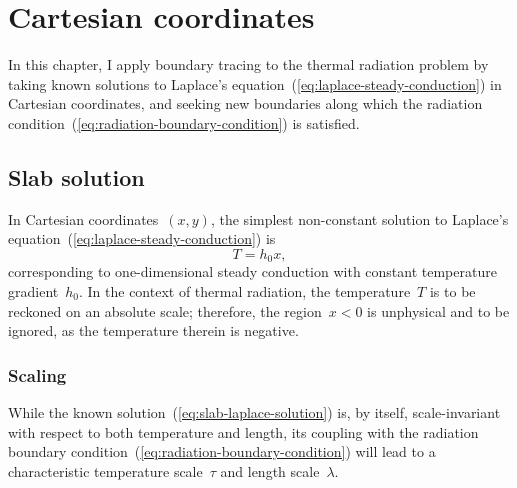 \chapter{Cartesian coordinates}
\label{ch:cartesian}

In this chapter,
I apply boundary tracing to the thermal radiation problem
by taking known solutions
to Laplace's equation~(\ref{eq:laplace-steady-conduction})
in Cartesian coordinates,
and seeking new boundaries along which
the radiation condition~(\ref{eq:radiation-boundary-condition})
is satisfied.

\section{Slab solution}
\label{sec:cartesian.slab}

In Cartesian coordinates~$(x, y)$,
the simplest non-constant solution
to Laplace's equation~(\ref{eq:laplace-steady-conduction})
is
\begin{equation}
  T = h_0 x,
  \label{eq:slab-laplace-solution}
\end{equation}
corresponding to one-dimensional steady conduction
with constant temperature gradient~$h_0$.
In the context of thermal radiation,
the temperature~$T$ is to be reckoned on an absolute scale;
therefore, the region~$x < 0$ is unphysical and to be ignored,
as the temperature therein is negative.

\subsection{Scaling}
\label{sec:cartesian.slab.scaling}

While the known solution~(\ref{eq:slab-laplace-solution}) is, by itself,
scale-invariant with respect to both temperature and length,
its coupling with
the radiation boundary condition~(\ref{eq:radiation-boundary-condition})
will lead to a characteristic temperature scale~$\tau$
and length scale~$\lambda$.

